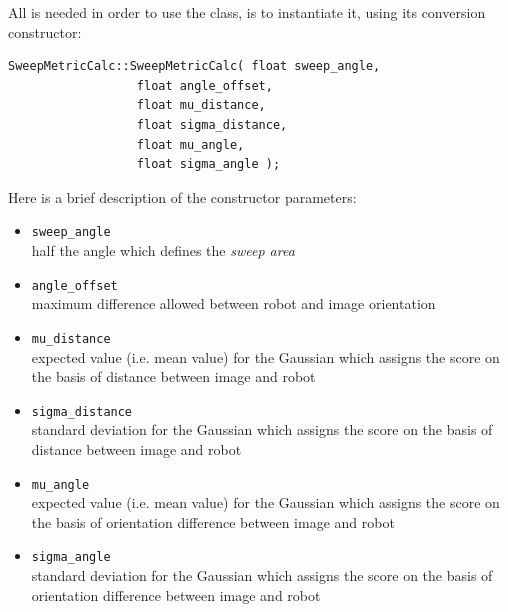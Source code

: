 %
All is needed in order to use the class, is to instantiate it,
using its conversion constructor:
%
\begin{lstlisting}[caption={\texttt{SweepMetricCalc} class declaration}, label={code:sweepmetriccalc}, frame=trBL]
SweepMetricCalc::SweepMetricCalc( float sweep_angle,
				  float angle_offset,
				  float mu_distance,
				  float sigma_distance,
				  float mu_angle,
				  float sigma_angle );				  
\end{lstlisting}
%
Here is a brief description of the constructor parameters:
%
\begin{itemize}
  \item \texttt{sweep\_angle} \\
    half the angle which defines the \textit{sweep area}
  \item \texttt{angle\_offset} \\
    maximum difference allowed between robot and 
    image orientation 
  \item \texttt{mu\_distance} \\
    expected value (i.e. mean value) for the Gaussian 
    which assigns the score on the basis of distance between
    image and robot
  \item \texttt{sigma\_distance} \\
    standard deviation for the Gaussian which assigns the 
    score on the basis of distance between image and robot
  \item \texttt{mu\_angle} \\
    expected value (i.e. mean value) for the Gaussian which 
    assigns the score on the basis of orientation difference
    between image and robot
  \item \texttt{sigma\_angle} \\
    standard deviation for the Gaussian which assigns the 
    score on the basis of orientation difference between image
    and robot
\end{itemize}
%
